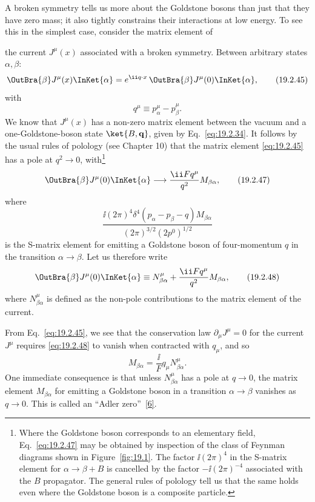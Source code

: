 A broken symmetry tells us more about the Goldstone bosons than just that
they have zero mass; it also tightly constrains their interactions at low
energy. To see this in the simplest case, consider the matrix element of



the current $J^\mu(x)$ associated with a broken symmetry. Between arbitrary
states $\alpha,\beta$:
\begin{equation}
 \OutBra{\beta}J^\mu(x)\InKet{\alpha}
 =e^{\ii q\cdot x}\,\OutBra{\beta}J^\mu(0)
 \InKet{\alpha},
 \tag{19.2.45}\label{eq:19.2.45}
\end{equation}
with
\begin{equation}
 q^\mu\equiv p_\alpha^\mu-p_\beta^\mu.
 \tag{19.2.46}\label{eq:19.2.46}
\end{equation}
We know that $J^\mu(x)$ has a non-zero matrix element between the vacuum and
a one-Goldstone-boson state $\ket{B,\mathbf q}$, given by
Eq.~\eqref{eq:19.2.34}. It follows by the usual rules of polology (see
Chapter 10) that the matrix element \eqref{eq:19.2.45} has a pole at
$q^2\to0$, with\footnote{Where the Goldstone boson corresponds to an
elementary field, Eq.~\eqref{eq:19.2.47} may be obtained by inspection of
the class of Feynman diagrams shown in Figure~\ref{fig:19.1}. The factor
$\ii(2\pi)^4$ in the S-matrix element for $\alpha\to\beta+B$ is cancelled by
the factor $-\ii(2\pi)^{-4}$ associated with the $B$ propagator. The general
rules of polology tell us that the same holds even where the Goldstone boson
is a composite particle.}
\begin{equation}
 \OutBra{\beta}J^\mu(0)\InKet{\alpha}
 \longrightarrow \frac{\ii Fq^\mu}{q^2}M_{\beta\alpha},
 \tag{19.2.47}\label{eq:19.2.47}
\end{equation}
where
\[
 \frac{\ii(2\pi)^4\delta^4(p_\alpha-p_\beta-q)M_{\beta\alpha}}
 {(2\pi)^{3/2}(2p^0)^{1/2}}
\]
is the S-matrix element for emitting a Goldstone boson of four-momentum $q$
in the transition $\alpha\to\beta$. Let us therefore write
\begin{equation}
 \OutBra{\beta}J^\mu(0)\InKet{\alpha}
 \equiv N^\mu_{\beta\alpha}
 +\frac{\ii Fq^\mu}{q^2}M_{\beta\alpha},
 \tag{19.2.48}\label{eq:19.2.48}
\end{equation}
where $N^\mu_{\beta\alpha}$ is defined as the non-pole contributions to the
matrix element of the current.



From Eq.~\eqref{eq:19.2.45}, we see that the conservation law
$\partial_\mu J^\mu=0$ for the current $J^\mu$ requires
\eqref{eq:19.2.48} to vanish when contracted with $q_\mu$, and so
\begin{equation}
 M_{\beta\alpha}=\frac{\ii}{F}q_\mu N^\mu_{\beta\alpha}.
 \tag{19.2.49}\label{eq:19.2.49}
\end{equation}
One immediate consequence is that unless $N^\mu_{\beta\alpha}$ has a pole at
$q\to0$, the matrix element $M_{\beta\alpha}$ for emitting a Goldstone boson
in a transition $\alpha\to\beta$ vanishes as $q\to0$. This is called an
``Adler zero''~\hyperref[ch19-ref-6]{[6]}.

